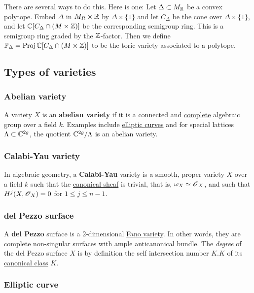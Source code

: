 \documentclass[11pt, english]{article}
\begin{document}
There are several ways to do this. Here is one: Let $\Delta \subset M_{\mathbb{R}}$ be a convex polytope. Embed $\Delta$ in $M_R \times \mathbb{R}$ by $\Delta \times \{1\}$ and let $C_\Delta$ be the cone over $\Delta \times \{ 1\}$, and let $\mathbb{C}[C_\Delta \cap (M \times \mathbb{Z})]$ be the corresponding semigroup ring. This is a semigroup ring graded by the $\mathbb{Z}$-factor. Then we define $\mathbb{P}_\Delta=\operatorname{Proj} \mathbb{C}[C_\Delta \cap (M \times \mathbb{Z})]$ to be the toric variety associated to a polytope.

\subsection{Types of varieties}
\subsubsection{Abelian variety}
\label{abelianvar}

A variety $X$ is an \textbf{abelian variety} if it is a connected and \hyperref[completevariety]{complete} algebraic group over a field $k$. Examples include \hyperref[ellipticc]{elliptic curves} and for special lattices $\Lambda \subset \mathbb{C}^{2g}$, the quotient $\mathbb{C}^{2g}/\Lambda$ is an abelian variety.

\subsubsection{Calabi-Yau variety}

In algebraic geometry, a \textbf{Calabi-Yau} variety is a smooth, proper variety $X$ over a field $k$ such that the \hyperref[canonicaldivisor]{canonical sheaf} is trivial, that is, $\omega_X \simeq \operatorname{\mathscr{O}}_X$, and such that $H^j(X,\operatorname{\mathscr{O}}_X)=0$ for $1 \leq j \leq n-1$. 

\subsubsection{del Pezzo surface}
\label{delpezzo}

A \textbf{del Pezzo} surface is a $2$-dimensional \hyperref[fano]{Fano variety}. In other words, they are complete non-singular surfaces with ample anticanonical bundle. The \emph{degree} of the del Pezzo surface $X$ is by definition the self intersection number $K.K$ of its \hyperref[canonicaldivisor]{canonical class} $K$. 

\subsubsection{Elliptic curve}
\label{ellipticc}
\end{document}
